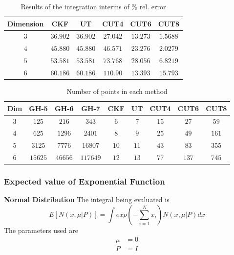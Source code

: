 \documentclass{beamer}
\begin{document}
\begin{frame}
\begin{table}
\caption{Results of the integration interms of \% rel. error }
\label{optsoln12}
\begin{center}

\begin{tabular}{|c||c|c|c|c|c|}
\hline
Dimension & CKF & UT & CUT4 & CUT6 & CUT8 \\
\hline
$3$ & $36.902 $  &  $36.902$ & $27.042$ & $13.273$ & $1.5688$  \\
\hline
$4$ & $45.880 $  &  $45.880 $ &  $46.571$ &  $23.276 $ & $2.0279$\\
\hline
$5$ & $53.581 $  &  $53.581 $ &  $73.768$ & $28.056 $ & $6.8219$\\
\hline
$6$ & $60.186$  &  $60.186 $ & $110.90$ & $13.393$ & $15.793$\\
\hline
\end{tabular}
\end{center}
\end{table}

\begin{table}
\caption{Number of points in each method }
\label{optsoln12}
\begin{center}
\small
\begin{tabular}{|c||c|c|c|c|c|c|c|c|}
\hline
Dim & GH-5     &  GH-6     &  GH-7      & CKF   & UT    & CUT4  & CUT6  & CUT8 \\
\hline
$3$       & $125 $   &  $216$    &  $343$    & $6$   & $7$   & $15$   & $27$   & $59$\\
\hline
$4$       & $625 $  &  $1296$   &  $2401$   & $8$   & $9$   & $25$   & $49$   & $161$\\
\hline
$5$       & $3125  $  &  $7776 $ &  $ 16807$   & $10$  & $11$  & $43$   & $83$   & $355$\\
\hline
$6$       & $15625$   &  $46656$  &  $117649$  & $12$  & $13$  & $77$   & $137$   & $745$\\
\hline
\end{tabular}
\end{center}
\end{table}
\end{frame}
\begin{frame}
\frametitle{Expected value of Exponential Function}
{\bf Normal Distribution}
The integral being evaluated is 
\begin{equation*}
E[N(x,\mu|P)]=\int{exp(-\sum_{i=1}^N{x_i})N(x,\mu|P)}dx
\end{equation*}
 The parameters used are
\begin{align*}
\mu&=0\\
P&=I
\end{align*}
\end{frame}
\end{document}
